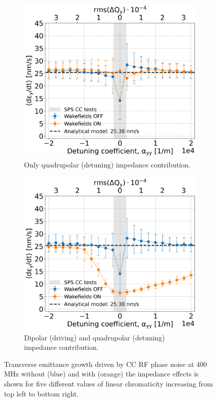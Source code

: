 \begin{figure}[htp]
\begin{subfigure}{.45\textwidth}
        \includegraphics[width=.95\linewidth]{images/Ch7/quadrupolar_impedance.png}
        \caption{Only quadrupolar (detuning) impedance contribution.}
        \label{fig:study_7_quad}
    \end{subfigure}
    \begin{subfigure}{.45\textwidth}
        \centering
        \includegraphics[width=.95\linewidth]{images/Ch7/deyRates_final_2018_PN_sps_270GeV_PN1e-8_400MHz_y-plane_QpxQpy5e-1_6D_Nb5e5_intensity3e10_ayyScan_wakesON_vs_OFF_vs_TuneSpreadvsExpectedSPS.png}  
        \caption{Dipolar (driving) and quadrupolar (detuning) impedance contribution.}
        \label{fig:study_7_dipole_and_quad}
    \end{subfigure}
    
    \caption{Transverse emittance growth driven by CC RF phase noise at 400\,MHz without (blue) and with (orange) the impedance effects is shown for five different values of linear chromaticity increasing from top left to bottom right.}
    \label{fig:study_7_dipole_vs_quadrupole}
\end{figure}




